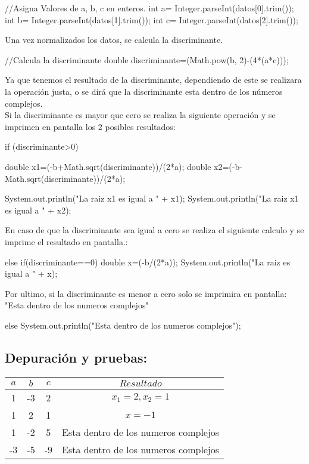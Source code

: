 \begin{javaCode}
    //Asigna Valores de a, b, c en enteros.
        int a= Integer.parseInt(datos[0].trim());
        int b= Integer.parseInt(datos[1].trim());
        int c= Integer.parseInt(datos[2].trim());
        
\end{javaCode}
Una vez normalizados los datos, se calcula la discriminante.
\begin{javaCode}
    //Calcula la discriminante
    double discriminante=(Math.pow(b, 2)-(4*(a*c)));
\end{javaCode}

Ya que tenemos el resultado de la discriminante, dependiendo de este se realizara la operación justa, o se dirá que la discriminante esta dentro de los números complejos.\\
Si la discriminante es mayor que cero se realiza la siguiente operación y se imprimen en pantalla los 2 posibles resultados:
\begin{javaCode}
    if (discriminante>0) {
        double x1=(-b+Math.sqrt(discriminante))/(2*a);
        double x2=(-b-Math.sqrt(discriminante))/(2*a);

        System.out.println("La raiz x1 es igual a " + x1);
        System.out.println("La raiz x1 es igual a " + x2);
            
        }
\end{javaCode}
En caso de que la discriminante sea igual a cero se realiza el siguiente calculo y se imprime el resultado en pantalla.:
\begin{javaCode}
    else if(discriminante==0){
            double x=(-b/(2*a));
            System.out.println("La raiz es igual a " + x);
        }
\end{javaCode}
Por ultimo, si la discriminante es menor a cero solo se imprimira en pantalla:\\"Esta dentro de los numeros complejos"
\begin{javaCode}
    else{
            System.out.println("Esta dentro de los numeros complejos");
        }
\end{javaCode}

\subsection{\textbf{Depuración y pruebas:}}
\begin{center}
    \begin{tabular}{|c|c|c|c|}
    \hline
    \textbf{\(a\)} & \textbf{\(b\)} & \textbf{\(c\)} & \textbf{\(Resultado\)} \\
    \hline
    1 & -3 & 2 & \(x_1 = 2, x_2 = 1\) \\
    \hline
    1 & 2 & 1 & \(x = -1\) \\
    \hline
    1 & -2 & 5 & Esta dentro de los numeros complejos\\
    \hline
    -3 & -5 & -9 & Esta dentro de los numeros complejos\\
    \hline
    \end{tabular}
    \end{center}
    
    \clearpage
